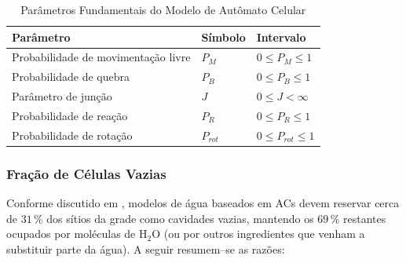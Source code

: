 \documentclass[12pt,oneside]{report}
\begin{document}
\begin{table}[H]
    \centering
    \caption{Parâmetros Fundamentais do Modelo de Autômato Celular}
    \vspace{0.2cm}
    \begin{tabularx}{\textwidth}{X m{3cm} m{3cm}}
        \hline
        \textbf{Parâmetro}                  & \textbf{Símbolo} & \textbf{Intervalo}      \\
        \hline
        Probabilidade de movimentação livre & $P_M$            & $0 \leq P_M \leq 1$     \\
        Probabilidade de quebra             & $P_B$            & $0 \leq P_B \leq 1$     \\
        Parâmetro de junção                 & $J$              & $0 \leq J < \infty$     \\
        Probabilidade de reação             & $P_R$            & $0 \leq P_R \leq 1$     \\
        Probabilidade de rotação            & $P_{rot}$        & $0 \leq P_{rot} \leq 1$ \\
        \hline
    \end{tabularx}

    \vspace{0.2cm}
\end{table}

\subsubsection{Fração de Células Vazias}
\label{subsubsec:fracao_celulas_vazias}

Conforme discutido em \citeauthor*{kier2005}, modelos de água baseados em ACs devem reservar cerca de $31\,\%$ dos sítios da grade como
cavidades vazias, mantendo os $69\,\%$ restantes ocupados por moléculas de
H$_2$O (ou por outros ingredientes que venham a substituir parte da água).
A seguir resumem--se as razões:
\end{document}
